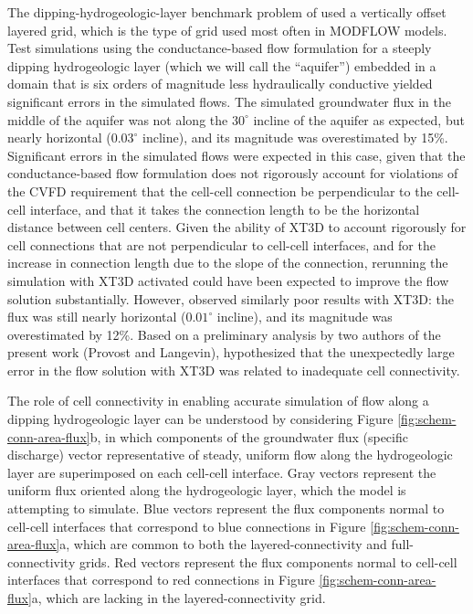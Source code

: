\documentclass{article}
\begin{document}
The dipping-hydrogeologic-layer benchmark problem of \cite{bardot2022} used a vertically offset layered grid, which is the type of grid used most often in MODFLOW models. Test simulations using the conductance-based flow formulation for a steeply dipping hydrogeologic layer (which we will call the ``aquifer'') embedded in a domain that is six orders of magnitude less hydraulically conductive yielded significant errors in the simulated flows. The simulated groundwater flux in the middle of the aquifer was not along the $30^{\circ}$ incline of the aquifer as expected, but nearly horizontal ($0.03^{\circ}$ incline), and its magnitude was overestimated by 15\%. Significant errors in the simulated flows were expected in this case, given that the conductance-based flow formulation does not rigorously account for violations of the CVFD requirement that the cell-cell connection be perpendicular to the cell-cell interface, and that it takes the connection length to be the horizontal distance between cell centers.  Given the ability of XT3D to account rigorously for cell connections that are not perpendicular to cell-cell interfaces, and for the increase in connection length due to the slope of the connection, rerunning the simulation with XT3D activated could have been expected to improve the flow solution substantially. However, \cite{bardot2022} observed similarly poor results with XT3D: the flux was still nearly horizontal ($0.01^{\circ}$ incline), and its magnitude was overestimated by 12\%. Based on a preliminary analysis by two authors of the present work (Provost and Langevin), \cite{bardot2022} hypothesized that the unexpectedly large error in the flow solution with XT3D was related to inadequate cell connectivity.

The role of cell connectivity in enabling accurate simulation of flow along a dipping hydrogeologic layer can be understood by considering Figure \ref{fig:schem-conn-area-flux}b, in which components of the groundwater flux (specific discharge) vector representative of steady, uniform flow along the hydrogeologic layer are superimposed on each cell-cell interface. Gray vectors represent the uniform flux oriented along the hydrogeologic layer, which the model is attempting to simulate. Blue vectors represent the flux components normal to cell-cell interfaces that correspond to blue connections in Figure \ref{fig:schem-conn-area-flux}a, which are common to both the layered-connectivity and full-connectivity grids. Red vectors represent the flux components normal to cell-cell interfaces that correspond to red connections in Figure \ref{fig:schem-conn-area-flux}a, which are lacking in the layered-connectivity grid.
\end{document}
